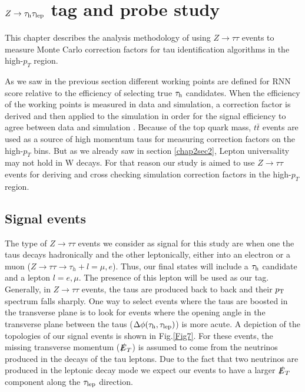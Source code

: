 \chapter{$Z\to\tau_\text{h}\tau_\text{lep}$ tag and probe study}\label{chap4}
This chapter describes the analysis methodology of using $Z\to\tau\tau$ events to measure Monte Carlo correction factors for tau identification algorithms in the high-$p_T$ region.

As we saw in the previous section different working points are defined for RNN score relative to the efficiency of selecting true $\tau_\text{h}$ candidates. When the efficiency of the working points is measured in data and simulation, a correction factor is derived and then applied to the simulation in order for the signal efficiency to agree between data and simulation \cite{ATLAS:2017mpa}. Because of the top quark mass, $t\bar{t}$ events are used as a source of high momentum taus for measuring correction factors on the high-$p_T$ bins. But as we already saw in section \ref{chap2sec2}, Lepton universality may not hold in W decays. For that reason our study is aimed to use $Z\to\tau\tau$ events for deriving and cross checking simulation correction factors in the high-$p_T$ region.   

\section{Signal events}\label{chap4sec1}
The type of $Z\to\tau\tau$ events we consider as signal for this study are when one the taus decays hadronically and the other leptonically, either into an electron or a muon ($Z\to\tau\tau\to\tau_h +l=\mu,e$). Thus, our final states will include a $\tau_\text{h}$ candidate and a lepton $l=e,\mu$. The presence of this lepton will be used as our tag. 
Generally, in $Z\to\tau\tau$ events, the taus are produced back to back and their $p_\text{T}$ spectrum falls sharply. One way to select events where the taus are boosted in the transverse plane is to look for events where the opening angle in the transverse plane between the taus ($\Delta\phi(\tau_\text{h},\tau_\text{lep})$) is more acute. A depiction of the topologies of our signal events is shown in Fig.\ref{Fig7}. For these events, the missing transverse momentum ($\slashed{E}_T$) is assumed to come from the neutrinos produced in the decays of the tau leptons. Due to the fact that two neutrinos are produced in the leptonic decay mode we expect our events to have a larger $\slashed{E}_T$ component along the $\tau_\text{lep}$ direction.

